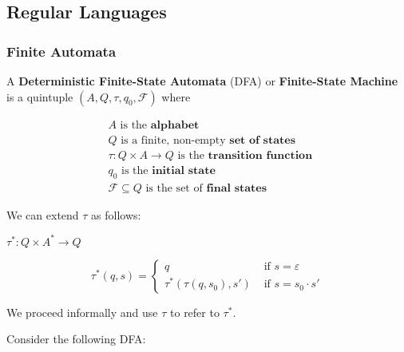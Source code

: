 \subsection{Regular Languages}\label{subsec:regular-languages}
\subsubsection{Finite Automata}

\begin{definition}
A \textbf{Deterministic Finite-State Automata} (DFA) or \textbf{Finite-State Machine} is a quintuple $(A, Q, \tau, q_0, \mathcal{F})$ where 

\begin{align*}
    &A\text{ is the }\textbf{alphabet}\\
    &Q\text{ is a finite, non-empty }\textbf{set of states}\\
    &\tau:Q\times A\to Q\text{ is the }\textbf{transition function }\\
    &q_0\text{ is the }\textbf{initial state}\\
    &\mathcal{F}\subseteq Q\text{ is the set of }\textbf{final states}
\end{align*}
\end{definition}
We can extend $\tau$ as follows: 

$\tau^*:Q\times A^*\to Q$

\[\tau^*(q, s) = \begin{cases} q &\mbox{ if } s=\varepsilon\\
                             \tau^*(\tau(q, s_0), s') &\mbox{ if } s=s_0\cdot s'\end{cases}\]

We proceed informally and use $\tau$ to refer to $\tau^*$. 

Consider the following DFA:

\begin{center}\end{center}

